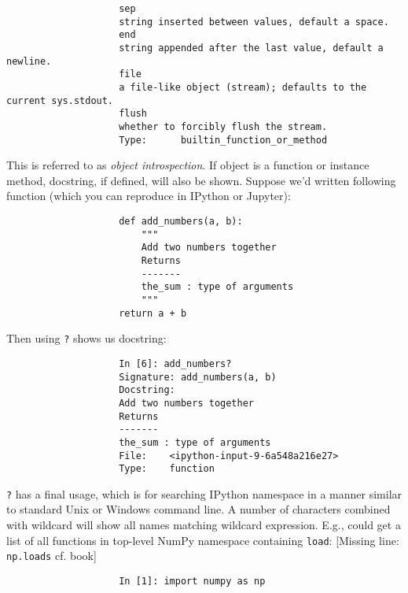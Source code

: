 \documentclass{article}
\begin{document}
\begin{enumerate}
\begin{itemize}
\begin{itemize}
\begin{itemize}
\begin{verbatim}
					sep
					string inserted between values, default a space.
					end
					string appended after the last value, default a newline.
					file
					a file-like object (stream); defaults to the current sys.stdout.
					flush
					whether to forcibly flush the stream.
					Type:      builtin_function_or_method
				\end{verbatim}
				This is referred to as {\it object introspection}. If object is a function or instance method, docstring, if defined, will also be shown. Suppose we'd written following function (which you can reproduce in IPython or Jupyter):
				\begin{verbatim}
					def add_numbers(a, b):
					    """
					    Add two numbers together
					    Returns
					    -------
					    the_sum : type of arguments
					    """
					return a + b
				\end{verbatim}
				Then using {\tt?} shows us docstring:
				\begin{verbatim}
					In [6]: add_numbers?
					Signature: add_numbers(a, b)
					Docstring:
					Add two numbers together
					Returns
					-------
					the_sum : type of arguments
					File:    <ipython-input-9-6a548a216e27>
					Type:    function
				\end{verbatim}
				{\tt?} has a final usage, which is for searching IPython namespace in a manner similar to standard Unix or Windows command line. A number of characters combined with wildcard {\tt*} will show all names matching wildcard expression. E.g., could get a list of all functions in top-level NumPy namespace containing {\tt load}: [Missing line: {\tt np.loads} cf. book]
				\begin{verbatim}
					In [1]: import numpy as np
					

\end{verbatim}
\end{itemize}
\end{itemize}
\end{itemize}
\end{enumerate}
\end{document}
